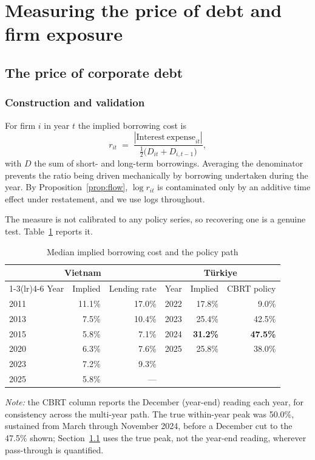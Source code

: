 \documentclass[review,12pt,authoryear]{elsarticle}
\theoremstyle{plain}
\theoremstyle{definition}
\begin{document}
\section{Measuring the price of debt and firm exposure}
\label{sec:measure}

\subsection{The price of corporate debt}
\label{sec:price}


\subsubsection{Construction and validation}

For firm $i$ in year $t$ the implied borrowing cost is
\begin{equation}
r_{it} \;=\; \frac{|\mathrm{Interest\ expense}_{it}|}
{\tfrac{1}{2}\bigl(D_{it}+D_{i,t-1}\bigr)} ,
\label{eq:impliedrate}
\end{equation}
with $D$ the sum of short- and long-term borrowings. Averaging the denominator
prevents the ratio being driven mechanically by borrowing undertaken during the
year. By Proposition~\ref{prop:flow}, $\log r_{it}$ is contaminated only by an
additive time effect under restatement, and we use logs throughout.

The measure is not calibrated to any policy series, so recovering one is a
genuine test. Table~\ref{tab:validate} reports it.

\begin{table}[htbp]
\centering
\caption{Median implied borrowing cost and the policy path}
\label{tab:validate}
\begin{tabular}{lrr@{\hskip 2em}lrr}
\toprule
\multicolumn{3}{c}{Vietnam} & \multicolumn{3}{c}{T\"{u}rkiye} \\
\cmidrule(lr){1-3}\cmidrule(lr){4-6}
Year & Implied & Lending rate & Year & Implied & CBRT policy \\
\midrule
2011 & 11.1\% & 17.0\% & 2022 & 17.8\% & 9.0\% \\
2013 & 7.5\%  & 10.4\% & 2023 & 25.4\% & 42.5\% \\
2015 & 5.8\%  & 7.1\%  & 2024 & \textbf{31.2\%} & \textbf{47.5\%} \\
2020 & 6.3\%  & 7.6\%  & 2025 & 25.8\% & 38.0\% \\
2023 & 7.2\%  & 9.3\%  &      &        &        \\
2025 & 5.8\%  & ---    &      &        &        \\
\bottomrule
\end{tabular}
\begin{minipage}{\textwidth}
\small\textit{Note:} the CBRT column reports the December (year-end) reading
each year, for consistency across the multi-year path. The true within-year
peak was 50.0\%, sustained from March through November 2024, before a
December cut to the 47.5\% shown; Section~\ref{sec:price} uses the true peak,
not the year-end reading, wherever pass-through is quantified.
\end{minipage}
\end{table}
\end{document}
